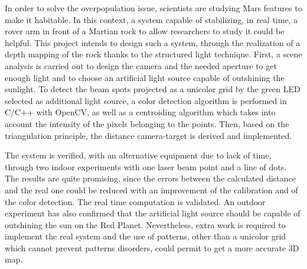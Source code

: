 In order to solve the overpopulation issue, scientists are studying Mars features to make it habitable. In this context, a system capable of stabilizing, in real time, a rover arm in front of a Martian rock to allow researchers to study it could be helpful. This project intends to design such a system, through the realization of a depth mapping of the rock thanks to the structured light technique. First, a scene analysis is carried out to design the camera and the needed aperture to get enough light and to choose an artificial light source capable of outshining the sunlight. To detect the beam spots projected as a unicolor grid by the green LED selected as additional light source, a color detection algorithm is performed in C/C++ with OpenCV, as well as a centroiding algorithm which takes into account the intensity of the pixels belonging to the points. Then, based on the triangulation principle, the distance camera-target is derived and implemented.

The system is verified, with an alternative equipment due to lack of time, through two indoor experiments with one laser beam point and a line of dots. The results are quite promising, since the errors between the calculated distance and the real one could be reduced with an improvement of the calibration and of the color detection. The real time computation is validated. An outdoor experiment has also confirmed that the artificial light source should be capable of outshining the sun on the Red Planet. Nevertheless, extra work is required to implement the real system and the use of patterns, other than a unicolor grid which cannot prevent patterns disorders, could permit to get a more accurate 3D map.